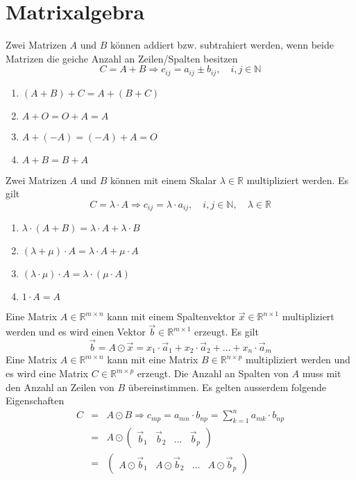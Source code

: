 \section{Matrixalgebra}
Zwei Matrizen $A$ und $B$ können addiert bzw. subtrahiert werden, wenn beide Matrizen die geiche Anzahl an Zeilen/Spalten besitzen
\begin{equation}
\boxed{C=A+B\Rightarrow c_{ij}=a_{ij}\pm b_{ij},\quad i,j\in \mathbb{N}}
\end{equation}
\begin{enumerate}[$(i)$]
\item $\left(A+B\right)+C=A+\left(B+C\right)$
\item $A+O=O+A=A$
\item $A+(-A)=(-A)+A=O$
\item $A+B=B+A$
\end{enumerate}
Zwei Matrizen $A$ und $B$ können mit einem Skalar $\lambda\in\mathbb{R}$ multipliziert werden. Es gilt
\begin{equation}
\boxed{C=\lambda\cdot A\Rightarrow c_{ij}=\lambda\cdot a_{ij},\quad i,j\in\mathbb{N},\quad \lambda\in\mathbb{R}}
\end{equation}
\begin{enumerate}[$(i)$]
\item $\lambda\cdot \left(A+B\right)=\lambda\cdot A+\lambda\cdot B$
\item $\left(\lambda+\mu\right)\cdot A=\lambda\cdot A+\mu\cdot A$
\item $\left(\lambda\cdot \mu\right)\cdot A=\lambda\cdot\left(\mu\cdot A\right)$
\item $1\cdot A=A$
\end{enumerate}
Eine Matrix $A\in\mathbb{R}^{m\times n}$ kann mit einem Spaltenvektor $\overrightarrow{x}\in\mathbb{R}^{n\times 1}$ multipliziert werden und es wird einen Vektor $\overrightarrow{b}\in\mathbb{R}^{m\times 1}$ erzeugt. Es gilt
\begin{equation}
\boxed{\overrightarrow{b}=A\odot \overrightarrow{x}=x_1\cdot \overrightarrow{a}_1+x_2\cdot \overrightarrow{a}_2+\dotso+x_n\cdot \overrightarrow{a}_m}
\end{equation}
Eine Matrix $A\in\mathbb{R}^{m\times n}$ kann mit eine Matrix $B\in\mathbb{R}^{n\times p}$ multipliziert werden und es wird eine Matrix $C\in\mathbb{R}^{m\times p}$ erzeugt. Die Anzahl an Spalten von $A$ muss mit den Anzahl an Zeilen von $B$ übereinstimmen. Es gelten ausserdem folgende Eigenschaften
\begin{equation}  
\boxed{\begin{array}{lll}  
C&=&A\odot B\Rightarrow c_{mp}=a_{mn}\cdot b_{np}=\displaystyle \sum_{k=1}^na_{mk}\cdot b_{np}\\
&=&A\odot \begin{pmatrix}\overrightarrow{b}_1&\overrightarrow{b}_2&\dotso&\overrightarrow{b}_p\end{pmatrix}\\
&=&\begin{pmatrix}A\odot \overrightarrow{b}_1&A\odot \overrightarrow{b}_2&\dotso&A\odot \overrightarrow{b}_p\end{pmatrix}\\
\end{array}}  
\end{equation}
